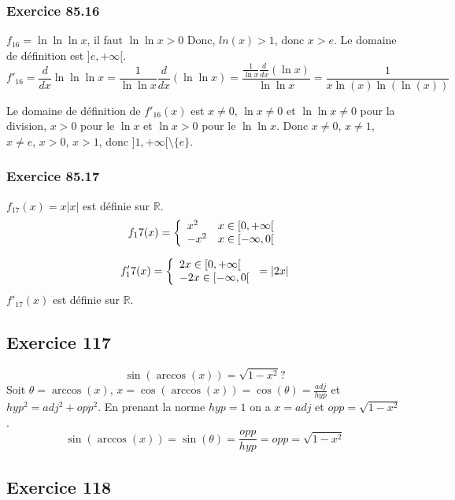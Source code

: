 \documentclass[]{book}
\theoremstyle{definition}
\newcommand{\bb}[1]{\mathbb{#1}}
\newcommand{\R}{\bb{R}}
\begin{document}
\subsubsection*{Exercice 85.16}
$f_{16} = \ln\ln\ln x$, il faut $\ln\ln x > 0$ Donc,  $ln(x) > 1$, donc $x>e$. Le domaine de d\'efinition est $]e,+\infty[$.\\

$$f'_{16} = \frac{d}{dx}\ln\ln\ln x = \frac{1}{\ln \ln x} \frac{d}{dx}(\ln\ln x) = \frac{\frac{1}{\ln x}\frac{d}{dx}(\ln x)}{\ln \ln x} = \frac{1}{x\ln(x)\ln(\ln(x))} $$

Le domaine de d\'efinition de $f'_{16}(x)$ est $x \neq 0$, $\ln x \neq 0$ et $\ln \ln x \neq 0$ pour la division, $x>0$ pour le $\ln x$ et $\ln x>0$ pour le $\ln \ln x$. Donc $x \neq 0$, $x \neq 1$, $x \neq e$, $x>0$, $x>1$, donc $]1,+\infty[\setminus \{e\}$.


\subsubsection*{Exercice 85.17}
$f_{17}(x) = x|x|$ est d\'efinie sur $\R$.
$$
f_17(x) = 
\left\{ 
\begin{array}{l l}
x^2 & x \in [0,+\infty[ \\
-x^2 & x \in [-\infty,0[ \\
\end{array}
\right. 
$$

$$
f'_17(x) = 
\left\{ 
\begin{array}{l l}
2x \in [0,+\infty[ \\
-2x \in [-\infty,0[ \\
\end{array}
\right. 
=
|2x|
$$
$f'_{17}(x)$ est d\'efinie sur $\R$.



\subsection*{Exercice 117}
$$\sin(\arccos(x)) = \sqrt{1-x^2}?$$
Soit $\theta=\arccos(x)$, $x=\cos(\arccos(x))=\cos(\theta)=\frac{adj}{hyp}$ et $hyp^2 = adj^2 + opp^2$. En prenant la norme $hyp=1$ on a $x=adj$ et $opp=\sqrt{1-x^2}$.\\
$$\sin(\arccos(x)) = \sin(\theta) = \frac{opp}{hyp} = opp = \sqrt{1-x^2}$$


\subsection*{Exercice 118}
\end{document}
